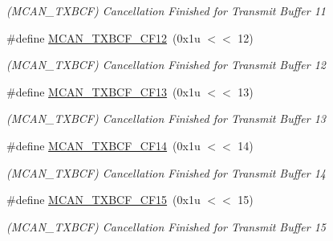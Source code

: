 \begin{DoxyCompactItemize}
\begin{DoxyCompactList}\small\item\em (M\+C\+A\+N\+\_\+\+T\+X\+B\+CF) Cancellation Finished for Transmit Buffer 11 \end{DoxyCompactList}\item 
\mbox{\label{group__SAMV71__MCAN_gae2ef7b028ebb3c702b8f4b560cc79fca}} 
\#define \mbox{\hyperlink{group__SAMV71__MCAN_gae2ef7b028ebb3c702b8f4b560cc79fca}{M\+C\+A\+N\+\_\+\+T\+X\+B\+C\+F\+\_\+\+C\+F12}}~(0x1u $<$$<$ 12)
\begin{DoxyCompactList}\small\item\em (M\+C\+A\+N\+\_\+\+T\+X\+B\+CF) Cancellation Finished for Transmit Buffer 12 \end{DoxyCompactList}\item 
\mbox{\label{group__SAMV71__MCAN_gae0299913b064b714821e37ac6435ef26}} 
\#define \mbox{\hyperlink{group__SAMV71__MCAN_gae0299913b064b714821e37ac6435ef26}{M\+C\+A\+N\+\_\+\+T\+X\+B\+C\+F\+\_\+\+C\+F13}}~(0x1u $<$$<$ 13)
\begin{DoxyCompactList}\small\item\em (M\+C\+A\+N\+\_\+\+T\+X\+B\+CF) Cancellation Finished for Transmit Buffer 13 \end{DoxyCompactList}\item 
\mbox{\label{group__SAMV71__MCAN_gad0f1622830756bc4da1916df0d0e2ca7}} 
\#define \mbox{\hyperlink{group__SAMV71__MCAN_gad0f1622830756bc4da1916df0d0e2ca7}{M\+C\+A\+N\+\_\+\+T\+X\+B\+C\+F\+\_\+\+C\+F14}}~(0x1u $<$$<$ 14)
\begin{DoxyCompactList}\small\item\em (M\+C\+A\+N\+\_\+\+T\+X\+B\+CF) Cancellation Finished for Transmit Buffer 14 \end{DoxyCompactList}\item 
\mbox{\label{group__SAMV71__MCAN_ga57155c6b1254fc5bcab710fa4066bd34}} 
\#define \mbox{\hyperlink{group__SAMV71__MCAN_ga57155c6b1254fc5bcab710fa4066bd34}{M\+C\+A\+N\+\_\+\+T\+X\+B\+C\+F\+\_\+\+C\+F15}}~(0x1u $<$$<$ 15)
\begin{DoxyCompactList}\small\item\em (M\+C\+A\+N\+\_\+\+T\+X\+B\+CF) Cancellation Finished for Transmit Buffer 15 \end{DoxyCompactList}\item 

\end{DoxyCompactItemize}
